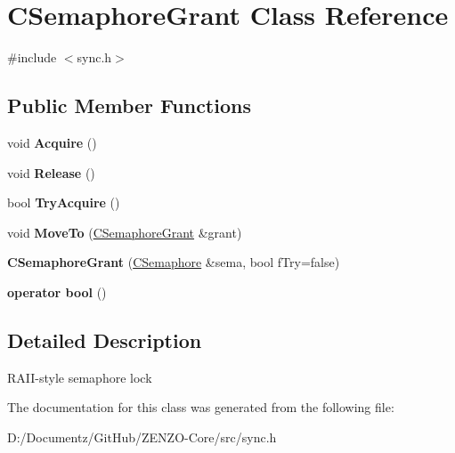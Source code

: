 \hypertarget{class_c_semaphore_grant}{}\section{C\+Semaphore\+Grant Class Reference}
\label{class_c_semaphore_grant}


{\ttfamily \#include $<$sync.\+h$>$}

\subsection*{Public Member Functions}
\begin{DoxyCompactItemize}
\item 
\mbox{\label{class_c_semaphore_grant_ac52976968379ea8e2470cfba877c3e89}} 
void {\bfseries Acquire} ()
\item 
\mbox{\label{class_c_semaphore_grant_a8d985eeace74e037baeb39bd2d586576}} 
void {\bfseries Release} ()
\item 
\mbox{\label{class_c_semaphore_grant_a9952d9ea087ced803c099f69992ebb1d}} 
bool {\bfseries Try\+Acquire} ()
\item 
\mbox{\label{class_c_semaphore_grant_ab3e6f84f304703abc52517b0c8de26cf}} 
void {\bfseries Move\+To} (\mbox{\hyperlink{class_c_semaphore_grant}{C\+Semaphore\+Grant}} \&grant)
\item 
\mbox{\label{class_c_semaphore_grant_a5998c457c7c223a8257166161d12b355}} 
{\bfseries C\+Semaphore\+Grant} (\mbox{\hyperlink{class_c_semaphore}{C\+Semaphore}} \&sema, bool f\+Try=false)
\item 
\mbox{\label{class_c_semaphore_grant_a91458b860e45949d87d770252e590a9b}} 
{\bfseries operator bool} ()
\end{DoxyCompactItemize}


\subsection{Detailed Description}
R\+A\+I\+I-\/style semaphore lock 

The documentation for this class was generated from the following file\+:\begin{DoxyCompactItemize}
\item 
D\+:/\+Documentz/\+Git\+Hub/\+Z\+E\+N\+Z\+O-\/\+Core/src/sync.\+h\end{DoxyCompactItemize}
